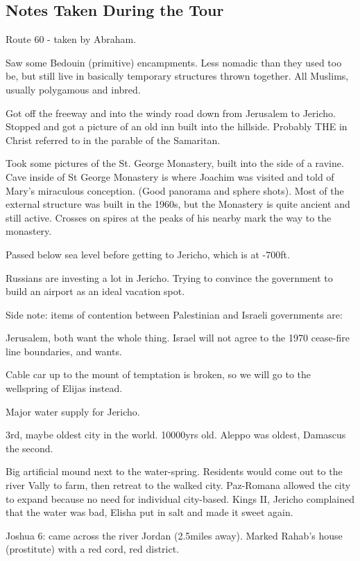 \documentclass[letterpaper]{report}
\begin{document}
\subsection{Notes Taken During the Tour}
Route 60 - taken by Abraham.

Saw some Bedouin (primitive) encampments. Less nomadic than they used too be, but still live in basically temporary structures thrown together.  All Muslims, usually polygamous and inbred.

Got off the freeway and into the windy road down from Jerusalem to Jericho. Stopped and got a picture of an old inn built into the hillside. Probably THE in Christ referred to in the parable of the Samaritan.

Took some pictures of the St. George Monastery, built into the side of a ravine. Cave inside of St George Monastery is where Joachim was visited and told of Mary's miraculous conception. (Good panorama and sphere shots). Most of the external structure was built in the 1960s, but the Monastery is quite ancient and still active. Crosses on spires at the peaks of his nearby mark the way to the monastery.

Passed below sea level before getting to Jericho, which is at -700ft.

Russians are investing a lot in Jericho. Trying to convince the government to build an airport as an ideal vacation spot.

Side note: items of contention between Palestinian and Israeli governments are:

Jerusalem, both want the whole thing.
Israel will not agree to the 1970 cease-fire line boundaries, and wants.

Cable car up to the mount of temptation is broken, so we will go to the wellspring of Elijas instead.

Major water supply for Jericho.

3rd, maybe oldest city in the world. 10000yrs old.
Aleppo was oldest, Damascus the second.

Big artificial mound next to the water-spring. Residents would come out to the river Vally to farm, then retreat to the walked city.
Paz-Romana allowed the city to expand because no need for individual city-based. Kings II, Jericho complained that the water was bad, Elisha put in salt and made it sweet again.

Joshua 6: came across the river Jordan (2.5miles away).  Marked Rahab's house (prostitute) with a red cord, red district.
\end{document}
